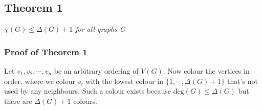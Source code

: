 \documentclass{report}
\begin{document}
\subsection{Theorem 1}
\begin{center}
\textit{$\chi(G) \leq \Delta(G) + 1$ for all graphs G}
\end{center}
\subsubsection{Proof of Theorem 1}
Let $v_1, v_2, \cdots, v_n$ be an arbitrary ordering of $V(G)$. Now colour the vertices in order, where we colour $v_i$ with the lowest colour in $\{1, \cdots, \Delta(G) + 1\}$ that's not used by any neighbours. Such a colour exists because $\mathrm{deg}(G) \leq \Delta(G)$ but there are $\Delta(G) + 1$ colours.
\end{document}
